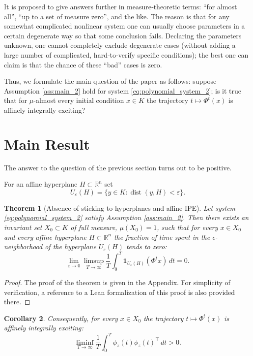 \documentclass[11pt]{article}
\newcommand{\R}{\mathbb{R}}
\newcommand{\eps}{\varepsilon}
\newcommand{\dd}{\,d}
\DeclareMathOperator{\dist}{dist}
\theoremstyle{thmstyleone}
\newtheorem{theorem}{Theorem}
\newtheorem{corollary}[theorem]{Corollary}
\theoremstyle{thmstyletwo}
\theoremstyle{thmstylethree}
\begin{document}
It is proposed to give answers further in measure‑theoretic terms: “for almost all”, “up to a set of measure zero”, and the like. The reason is that for any somewhat complicated nonlinear system one can usually choose parameters in a certain degenerate way so that some conclusion fails. Declaring the parameters unknown, one cannot completely exclude degenerate cases (without adding a large number of complicated, hard‑to‑verify specific conditions); the best one can claim is that the chance of these “bad” cases is zero.

Thus, we formulate the main question of the paper as follows: suppose Assumption \ref{ass:main_2} hold for system \ref{eq:polynomial_system_2}; is it true that for $\mu$-almost every initial condition $x\in K$ the trajectory $t\mapsto\Phi^t(x)$ is affinely integrally exciting?



\section{Main Result}
\label{sec:main_result_2}


 The answer to the question of the previous section turns out to be positive.


For an affine hyperplane $H\subset\R^n$ set
\[
    U_\eps(H)=\{y\in K:\dist(y,H)<\eps\}.
\]

\begin{theorem}[Absence of sticking to hyperplanes and affine IPE]
\label{thm:main_nonsticking_2}
Let system \ref{eq:polynomial_system_2} satisfy Assumption \ref{ass:main_2}. Then there exists an invariant set $X_0\subset K$ of full measure, $\mu(X_0)=1$, such that for every $x\in X_0$ and every affine hyperplane $H\subset\R^n$ the fraction of time spent in the $\epsilon$-neighborhood of the hyperplane $U_\eps(H)$ tends to zero:
\begin{equation}\label{eq:main_nonsticking_2}
    \lim_{\eps\to0}\limsup_{T\to\infty}
    \frac1T\int_0^T\mathbf 1_{U_\eps(H)}(\Phi^t x)\dd t=0.
\end{equation}

\end{theorem}
\begin{proof}
    The proof of the theorem is given in the Appendix. For simplicity of verification, a reference to a Lean formalization of this proof is also provided there.
\end{proof}
\begin{corollary}
   Consequently, for every $x\in X_0$ the trajectory $t\mapsto\Phi^t(x)$ is affinely integrally exciting:
\begin{equation}\label{eq:main_ipe_2}
    \liminf_{T\to\infty}
    \frac1T\int_0^T \phi_z(t)\phi_z(t)^\top\dd t
    >0.
\end{equation}
\end{corollary}
\end{document}
